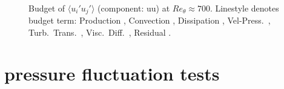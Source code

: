 \begin{figure}[H]
\centering
\begin{subfigure}[t]{0.495\textwidth}
    \subcaption{}
    \centering
    
    \label{fig:R500deg18Re1200p}
\end{subfigure}
\hfill
\begin{subfigure}[t]{0.495\textwidth}
    \centering
    \subcaption{}
    
    \label{fig:R500deg18Re1200Uinf}
\end{subfigure}
\\[-20pt]
\begin{subfigure}[t]{0.495\textwidth}
    \centering
    \subcaption{}
    
    \label{fig:R500deg18Re1200Beta}
\end{subfigure}
\hfill
\begin{subfigure}[t]{0.495\textwidth}
    \centering
    \subcaption{}
    
    \label{fig:R500deg18Re1200Budget}
\end{subfigure}
\caption{Budget of $\langle u_i' u_j' \rangle$ (component: uu) at $Re_\theta \approx 700$.
Linestyle denotes budget term:
Production ,
Convection ,
Dissipation ,
Vel-Press.\ ,
Turb.\ Trans.\ ,
Visc.\ Diff.\ ,
Residual .}
\label{fig:R500deg18Re1200}
\end{figure}


\section{pressure fluctuation tests}